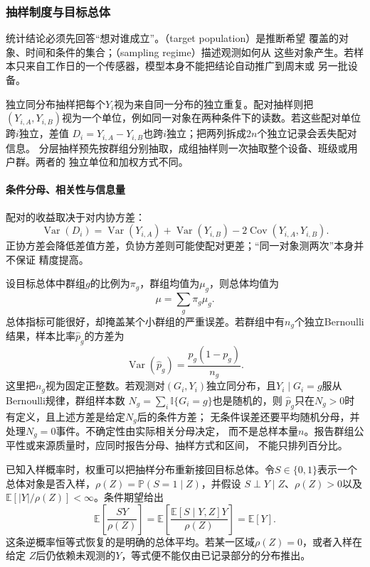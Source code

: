 \subsubsection{抽样制度与目标总体}
\label{sec:statistics-sampling-population}
\label{sec:statistics-missingness-observation}
统计结论必须先回答“想对谁成立”。（target population）是推断希望
覆盖的对象、时间和条件的集合；（sampling regime）描述观测如何从
这些对象产生。若样本只来自工作日的一个传感器，模型本身不能把结论自动推广到周末或
另一批设备。

独立同分布抽样把每个\(Y_i\)视为来自同一分布的独立重复。配对抽样则把
\((Y_{i,A},Y_{i,B})\)视为一个单位，例如同一对象在两种条件下的读数。若这些配对单位跨\(i\)独立，差值
\(D_i=Y_{i,A}-Y_{i,B}\)也跨\(i\)独立；把两列拆成\(2n\)个独立记录会丢失配对信息。
分层抽样预先按群组分别抽取，成组抽样则一次抽取整个设备、班级或用户群。两者的
独立单位和加权方式不同。

\paragraph{条件分母、相关性与信息量}
配对的收益取决于对内协方差：
\[
  \operatorname{Var}(D_i)
  =\operatorname{Var}(Y_{i,A})+\operatorname{Var}(Y_{i,B})
   -2\operatorname{Cov}(Y_{i,A},Y_{i,B}).
\]
正协方差会降低差值方差，负协方差则可能使配对更差；“同一对象测两次”本身并不保证
精度提高。

设目标总体中群组\(g\)的比例为\(\pi_g\)，群组均值为\(\mu_g\)，则总体均值为
\[
  \mu=\sum_g\pi_g\mu_g.
\]
总体指标可能很好，却掩盖某个小群组的严重误差。若群组中有\(n_g\)个独立Bernoulli
结果，样本比率\(\widehat p_g\)的方差为
\[
  \operatorname{Var}(\widehat p_g)
  =\frac{p_g(1-p_g)}{n_g}.
\]
这里把\(n_g\)视为固定正整数。若观测对\((G_i,Y_i)\)独立同分布，且\(Y_i\mid G_i=g\)服从Bernoulli规律，群组样本数
\(N_g=\sum_i\mathbb{I}\{G_i=g\}\)也是随机的，则
\(\widehat p_g\)只在\(N_g>0\)时有定义，且上述方差是给定\(N_g\)后的条件方差；
无条件误差还要平均随机分母，并处理\(N_g=0\)事件。不确定性由实际相关分母决定，
而不是总样本量\(n\)。报告群组公平性或来源质量时，应同时报告分母、抽样方式和区间，
不能只排列百分比。

已知入样概率时，权重可以把抽样分布重新接回目标总体。令\(S\in\{0,1\}\)表示一个
总体对象是否入样，\(\rho(Z)=\mathbb{P}(S=1\mid Z)\)，并假设
\(S\mathrel{\perp}Y\mid Z\)、\(\rho(Z)>0\)以及
\(\mathbb{E}[|Y|/\rho(Z)]<\infty\)。条件期望给出
\[
  \mathbb{E}\left[\frac{SY}{\rho(Z)}\right]
  =\mathbb{E}\left[
    \frac{\mathbb{E}[S\mid Y,Z]Y}{\rho(Z)}
  \right]
  =\mathbb{E}[Y].
\]
这条逆概率恒等式恢复的是明确的总体平均。若某一区域\(\rho(Z)=0\)，或者入样在给定
\(Z\)后仍依赖未观测的\(Y\)，等式便不能仅由已记录部分的分布推出。

